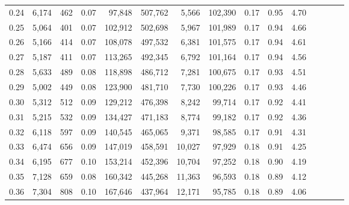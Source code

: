 \begin{tabular}{rrrcrrrrrrrrrrr}
0.24 &   6,174 &    462 &                                       0.07 &   97,848 &  507,762 &    5,566 &  102,390 &  0.17 &  0.95 &                         4.70 \\
0.25 &   5,064 &    401 &                                       0.07 &  102,912 &  502,698 &    5,967 &  101,989 &  0.17 &  0.94 &                         4.66 \\
0.26 &   5,166 &    414 &                                       0.07 &  108,078 &  497,532 &    6,381 &  101,575 &  0.17 &  0.94 &                         4.61 \\
0.27 &   5,187 &    411 &                                       0.07 &  113,265 &  492,345 &    6,792 &  101,164 &  0.17 &  0.94 &                         4.56 \\
0.28 &   5,633 &    489 &                                       0.08 &  118,898 &  486,712 &    7,281 &  100,675 &  0.17 &  0.93 &                         4.51 \\
0.29 &   5,002 &    449 &                                       0.08 &  123,900 &  481,710 &    7,730 &  100,226 &  0.17 &  0.93 &                         4.46 \\
0.30 &   5,312 &    512 &                                       0.09 &  129,212 &  476,398 &    8,242 &   99,714 &  0.17 &  0.92 &                         4.41 \\
0.31 &   5,215 &    532 &                                       0.09 &  134,427 &  471,183 &    8,774 &   99,182 &  0.17 &  0.92 &                         4.36 \\
0.32 &   6,118 &    597 &                                       0.09 &  140,545 &  465,065 &    9,371 &   98,585 &  0.17 &  0.91 &                         4.31 \\
0.33 &   6,474 &    656 &                                       0.09 &  147,019 &  458,591 &   10,027 &   97,929 &  0.18 &  0.91 &                         4.25 \\
0.34 &   6,195 &    677 &                                       0.10 &  153,214 &  452,396 &   10,704 &   97,252 &  0.18 &  0.90 &                         4.19 \\
0.35 &   7,128 &    659 &                                       0.08 &  160,342 &  445,268 &   11,363 &   96,593 &  0.18 &  0.89 &                         4.12 \\
0.36 &   7,304 &    808 &                                       0.10 &  167,646 &  437,964 &   12,171 &   95,785 &  0.18 &  0.89 &                         4.06 \\

\end{tabular}

